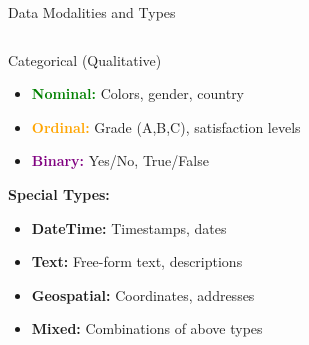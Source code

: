 \documentclass[8pt,aspectratio=1610]{beamer}
\begin{document}
\begin{frame}{Data Modalities and Types}
\begin{columns}[t]
\begin{column}{0.48\textwidth}
\begin{block}{Categorical (Qualitative)}
\begin{itemize}
\setlength{\itemsep}{1pt}
\item \textcolor{green}{\textbf{Nominal:}} Colors, gender, country
\item \textcolor{orange}{\textbf{Ordinal:}} Grade (A,B,C), satisfaction levels
\item \textcolor{purple}{\textbf{Binary:}} Yes/No, True/False
\end{itemize}
\end{block}

\textbf{Special Types:}
\begin{itemize}
\setlength{\itemsep}{1pt}
\item \textbf{DateTime:} Timestamps, dates
\item \textbf{Text:} Free-form text, descriptions
\item \textbf{Geospatial:} Coordinates, addresses
\item \textbf{Mixed:} Combinations of above types
\end{itemize}
\end{column}
\end{columns}
\end{frame}
\end{document}
